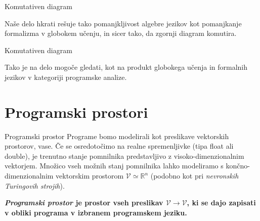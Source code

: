 \documentclass{beamer}
\newcommand{\RR}{\mathbb{R}}
\newcommand{\VV}{\mathcal{V}}
\begin{document}
\begin{frame}[fragile]{Komutativen diagram}
\begin{figure}[h]
\begin{center}
\end{center}
\end{figure}

Naše delo hkrati rešuje tako pomanjkljivost algebre jezikov kot pomanjkanje formalizma v globokem učenju, in sicer tako, da zgornji diagram komutira.

\end{frame}

\begin{frame}[fragile]{Komutativen diagram}
\begin{figure}[h]
\begin{center}
\end{center}
\end{figure}

Tako je na delo mogoče gledati, kot na produkt globokega učenja in formalnih jezikov v kategoriji programske analize.

\end{frame}

\section{Programski prostori}

\begin{frame}{Programski prostor}
Programe bomo modelirali kot preslikave vektorskih prostorov, vase. Če se osredotočimo na realne spremenljivke (tipa float ali double), je trenutno stanje pomnilnika predstavljivo z visoko-dimenzionalnim vektorjem. Množico vseh možnih stanj pomnilnika lahko modeliramo s končno-dimenzionalnim vektorskim prostorom $\VV\simeq\RR^n$ (podobno kot pri \emph{nevronskih Turingovih strojih}).

\textbf{\emph{Programski prostor} je prostor vseh preslikav $\VV\to\VV$, ki se dajo zapisati v obliki programa v izbranem programskem jeziku.}
\end{frame}
\end{document}

